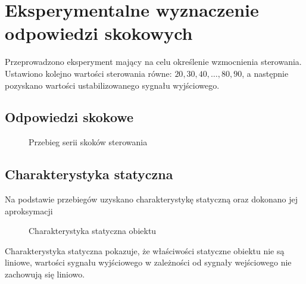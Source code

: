 \section{Eksperymentalne wyznaczenie odpowiedzi skokowych}
\label{lab:zad2}

Przeprowadzono eksperyment mający na celu określenie wzmocnienia
sterowania. Ustawiono kolejno wartości sterowania równe: $20, 30 , 40, … , 80, 90$,
a następnie pozyskano wartości ustabilizowanego sygnału wyjściowego.


\subsection{Odpowiedzi skokowe}
\label{lab:zad2:odpSkok}

\begin{figure}[H] 
   \centering
   
   \caption{Przebieg serii skoków sterowania}
   \label{lab:zad2:zad2odpSkok:figure}
\end{figure}

\newpage

\subsection{Charakterystyka statyczna}
\label{lab:zad2:charStat}

Na podstawie przebiegów uzyskano charakterystykę statyczną oraz dokonano jej
aproksymacji

\begin{figure}[H] 
    \centering
    
    \caption{Charakterystyka statyczna obiektu}
    \label{lab:zad2:zad2charStat:figure}
 \end{figure}

 Charakterystyka statyczna pokazuje, że właściwości statyczne obiektu nie są
liniowe, wartości sygnału wyjściowego w zależności od sygnały wejściowego nie
zachowują się liniowo.

\newpage
